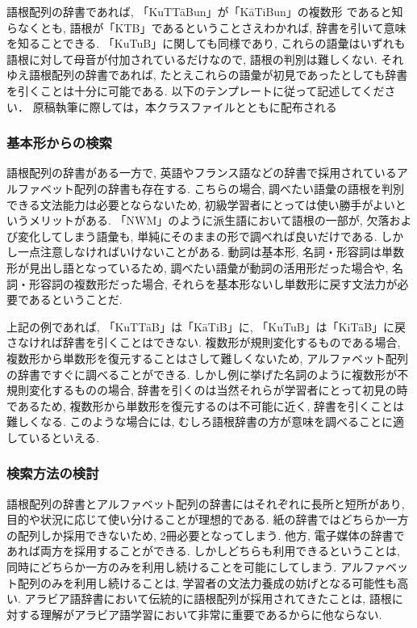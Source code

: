 \documentclass[technicalreport]{ieicej}
\begin{document}
語根配列の辞書であれば, 「KuTTāBun」が「KāTiBun」の複数形 であると知らなくとも, 語根が「KTB」であるということさえわかれば, 辞書を引いて意味を知ることできる. 「KuTuB」に関しても同様であり, これらの語彙はいずれも語根に対して母音が付加されているだけなので, 語根の判別は難しくない. それゆえ語根配列の辞書であれば, たとえこれらの語彙が初見であったとしても辞書を引くことは十分に可能である. 
以下のテンプレートに従って記述してください．
原稿執筆に際しては，本クラスファイルとともに配布される

\subsubsection{基本形からの検索}
語根配列の辞書がある一方で, 英語やフランス語などの辞書で採用されているアルファベット配列の辞書も存在する. こちらの場合, 調べたい語彙の語根を判別できる文法能力は必要とならないため, 初級学習者にとっては使い勝手がよいというメリットがある. 「NWM」のように派生語において語根の一部が, 欠落および変化してしまう語彙も, 単純にそのままの形で調べれば良いだけである. しかし一点注意しなければいけないことがある. 動詞は基本形, 名詞・形容詞は単数形が見出し語となっているため, 調べたい語彙が動詞の活用形だった場合や, 名詞・形容詞の複数形だった場合, それらを基本形ないし単数形に戻す文法力が必要であるということだ. 

上記の例であれば, 「KuTTāB」は「KāTiB」に, 「KuTuB」は「KiTāB」に戻さなければ辞書を引くことはできない. 複数形が規則変化するものである場合, 複数形から単数形を復元することはさして難しくないため, アルファベット配列の辞書ですぐに調べることができる. しかし例に挙げた名詞のように複数形が不規則変化するものの場合, 辞書を引くのは当然それらが学習者にとって初見の時であるため, 複数形から単数形を復元するのは不可能に近く, 辞書を引くことは難しくなる. このような場合には, むしろ語根辞書の方が意味を調べることに適しているといえる. 

\subsubsection{検索方法の検討}
語根配列の辞書とアルファベット配列の辞書にはそれぞれに長所と短所があり, 目的や状況に応じて使い分けることが理想的である. 紙の辞書ではどちらか一方の配列しか採用できないため, 2冊必要となってしまう. 他方, 電子媒体の辞書であれば両方を採用することができる. しかしどちらも利用できるということは, 同時にどちらか一方のみを利用し続けることを可能にしてしまう. アルファベット配列のみを利用し続けることは, 学習者の文法力養成の妨げとなる可能性も高い. アラビア語辞書において伝統的に語根配列が採用されてきたことは, 語根に対する理解がアラビア語学習において非常に重要であるからに他ならない. 
\end{document}
